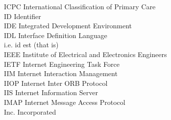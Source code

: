 \begin{tabbing}
    \>ICPC \>\>International Classification of Primary Care\\


    \>ID \>\>Identifier\\

    \>IDE \>\>Integrated Development Environment\\


    \>IDL \>\>Interface Definition Language\\


    \>i.e. \>\>id est (that is)\\

    \>IEEE \>\>Institute of Electrical and Electronics Engineers\\

    \>IETF \>\>Internet Engineering Task Force\\




    \>IIM \>\>Internet Interaction Management\\

    \>IIOP \>\>Internet Inter ORB Protocol\\

    \>IIS \>\>Internet Information Server\\


    \>IMAP \>\>Internet Message Access Protocol\\



    \>Inc. \>\>Incorporated\\


\end{tabbing}
